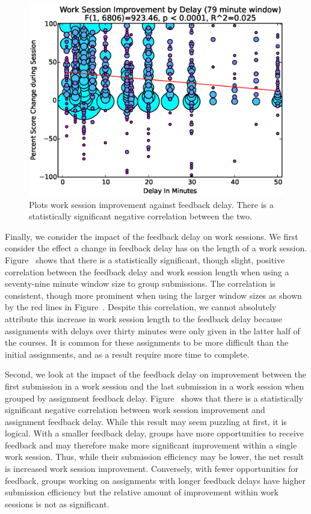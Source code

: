 \begin{figure}[!t]
\centering
\includegraphics[width=5.25in]{graphs/Work_Session_Improvement_by_Delay_(79_minute_window).eps}
\caption{Plots work session improvement against feedback delay. There is a
  statistically significant negative correlation between the two.}
\end{figure}

Finally, we consider the impact of the feedback delay on work sessions. We
first consider the effect a change in feedback delay has on the length of a
work session. Figure~ shows that there is a
statistically significant, though slight, positive correlation between the
feedback delay and work session length when using a seventy-nine minute window
size to group submissions. The correlation is consistent, though more prominent
when using the larger window sizes as shown by the red lines in
Figure~. Despite this correlation, we cannot
absolutely attribute this increase in work session length to the feedback delay
because assignments with delays over thirty minutes were only given in the
latter half of the courses. It is common for these assignments to be more
difficult than the initial assignments, and as a result require more time to
complete.

Second, we look at the impact of the feedback delay on improvement between the
first submission in a work session and the last submission in a work session
when grouped by assignment feedback
delay. Figure~ shows that there is a
statistically significant negative correlation between work session improvement
and assignment feedback delay. While this result may seem puzzling at first, it
is logical. With a smaller feedback delay, groups have more opportunities to
receive feedback and may therefore make more significant improvement within a
single work session. Thus, while their submission efficiency may be lower, the
net result is increased work session improvement. Conversely, with fewer
opportunities for feedback, groups working on assignments with longer feedback
delays have higher submission efficiency but the relative amount of improvement
within work sessions is not as significant.

